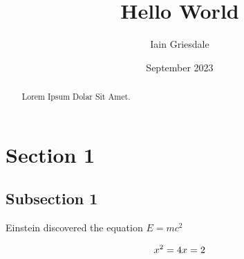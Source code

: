 \documentclass[titlepage]{article}
\title{Hello World}
\author{Iain Griesdale}
\date{September 2023}
\begin{document}
\maketitle

\begin{abstract}
    Lorem Ipsum Dolar Sit Amet.
\end{abstract}

\section{Section 1}

\subsection{Subsection 1}

Einstein discovered the equation $E=mc^2$

\begin{equation}
    x^2=4 \\
    x=2
\end{equation}
\end{document}
